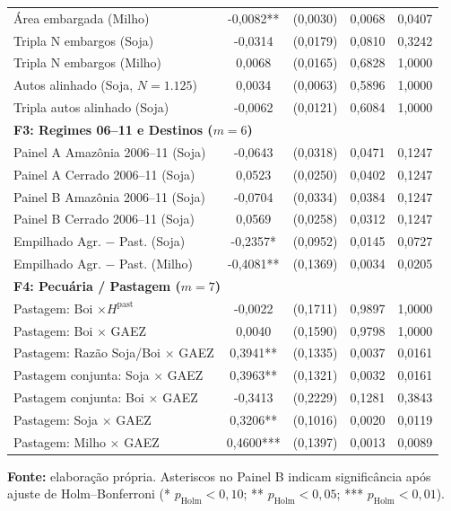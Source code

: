 \begin{table}[htbp]
\begin{tabular}{lcccc}
\quad Área embargada (Milho) & -0,0082** & (0,0030) & 0,0068 & 0,0407 \\
\quad Tripla N embargos (Soja) & -0,0314 & (0,0179) & 0,0810 & 0,3242 \\
\quad Tripla N embargos (Milho) & 0,0068 & (0,0165) & 0,6828 & 1,0000 \\
\quad Autos alinhado (Soja, $N=1.125$) & 0,0034 & (0,0063) & 0,5896 & 1,0000 \\
\quad Tripla autos alinhado (Soja) & -0,0062 & (0,0121) & 0,6084 & 1,0000 \\
\multicolumn{5}{l}{\textbf{F3: Regimes 06--11 e Destinos ($m=6$)}} \\
\quad Painel A Amazônia 2006--11 (Soja) & -0,0643 & (0,0318) & 0,0471 & 0,1247 \\
\quad Painel A Cerrado 2006--11 (Soja) & 0,0523 & (0,0250) & 0,0402 & 0,1247 \\
\quad Painel B Amazônia 2006--11 (Soja) & -0,0704 & (0,0334) & 0,0384 & 0,1247 \\
\quad Painel B Cerrado 2006--11 (Soja) & 0,0569 & (0,0258) & 0,0312 & 0,1247 \\
\quad Empilhado Agr. $-$ Past. (Soja) & -0,2357* & (0,0952) & 0,0145 & 0,0727 \\
\quad Empilhado Agr. $-$ Past. (Milho) & -0,4081** & (0,1369) & 0,0034 & 0,0205 \\
\multicolumn{5}{l}{\textbf{F4: Pecuária / Pastagem ($m=7$)}} \\
\quad Pastagem: Boi $\times H^{\text{past}}$ & -0,0022 & (0,1711) & 0,9897 & 1,0000 \\
\quad Pastagem: Boi $\times$ GAEZ & 0,0040 & (0,1590) & 0,9798 & 1,0000 \\
\quad Pastagem: Razão Soja/Boi $\times$ GAEZ & 0,3941** & (0,1335) & 0,0037 & 0,0161 \\
\quad Pastagem conjunta: Soja $\times$ GAEZ & 0,3963** & (0,1321) & 0,0032 & 0,0161 \\
\quad Pastagem conjunta: Boi $\times$ GAEZ & -0,3413 & (0,2229) & 0,1281 & 0,3843 \\
\quad Pastagem: Soja $\times$ GAEZ & 0,3206** & (0,1016) & 0,0020 & 0,0119 \\
\quad Pastagem: Milho $\times$ GAEZ & 0,4600*** & (0,1397) & 0,0013 & 0,0089 \\
\bottomrule
\end{tabular}
\par\smallskip\begin{minipage}{\textwidth}\footnotesize
\SingleSpacing
\noindent\textbf{Fonte:} elaboração própria. Asteriscos no Painel B indicam significância após ajuste de Holm--Bonferroni (* $p_{\text{Holm}}<0{,}10$; ** $p_{\text{Holm}}<0{,}05$; *** $p_{\text{Holm}}<0{,}01$).\par\medskip

\end{minipage}
\end{table}
